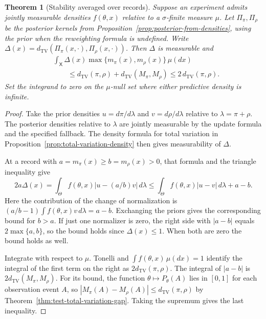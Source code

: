 \documentclass[11pt,oneside]{book}
\newtheorem{theorem}{Theorem}[chapter]
\theoremstyle{definition}
\theoremstyle{remark}
\begin{document}
\begin{theorem}[Stability averaged over records]
\label{thm:bayesian-prior-sensitivity-average}
Suppose an experiment admits jointly measurable densities
$f(\theta,x)$ relative to a $\sigma$-finite measure $\mu$.
Let $\Pi_\pi,\Pi_\rho$ be the posterior kernels from
Proposition~\ref{prop:posterior-from-densities}, using the prior
when the reweighting formula is undefined. Write
$\Delta(x)=d_{\mathrm{TV}}(\Pi_\pi(x,\cdot),\Pi_\rho(x,\cdot))$.
Then $\Delta$ is measurable and
\begin{equation}
\begin{aligned}
&\int_{\mathsf X}\Delta(x)\max\{m_\pi(x),m_\rho(x)\}\,\mu(dx)\\
&\qquad\leq d_{\mathrm{TV}}(\pi,\rho)+d_{\mathrm{TV}}(M_\pi,M_\rho)
\leq 2\,d_{\mathrm{TV}}(\pi,\rho).
\end{aligned}
\label{eq:bayesian-prior-sensitivity-average}
\end{equation}
Set the integrand to zero on the $\mu$-null set where either
predictive density is infinite.
\end{theorem}
\begin{proof}
Take the prior densities $u=d\pi/d\lambda$ and $v=d\rho/d\lambda$
relative to $\lambda=\pi+\rho$. The posterior densities relative
to $\lambda$ are jointly measurable by the update formula and
the specified fallback. The density formula for total variation
in Proposition~\ref{prop:total-variation-density} then gives
measurability of $\Delta$.

At a record with $a=m_\pi(x)\geq b=m_\rho(x)>0$, that formula
and the triangle inequality give
\[
2a\Delta(x)
=\int_\Theta f(\theta,x)|u-(a/b)v|\,d\lambda
\leq\int_\Theta f(\theta,x)|u-v|\,d\lambda +a-b.
\]
Here the contribution of the change of normalization is
$(a/b-1)\int f(\theta,x)v\,d\lambda=a-b$.
Exchanging the priors gives the corresponding bound for $b>a$.
If just one normalizer is zero, the right side with $|a-b|$
equals $2\max\{a,b\}$, so the bound holds since $\Delta(x)\leq1$.
When both are zero the bound holds as well.

Integrate with respect to $\mu$. Tonelli and
$\int f(\theta,x)\,\mu(dx)=1$ identify the integral of the
first term on the right as $2d_{\mathrm{TV}}(\pi,\rho)$.
The integral of $|a-b|$ is $2d_{\mathrm{TV}}(M_\pi,M_\rho)$.
For its bound, the function $\theta\mapsto P_\theta(A)$ lies
in $[0,1]$ for each observation event $A$, so
$|M_\pi(A)-M_\rho(A)|\leq d_{\mathrm{TV}}(\pi,\rho)$ by
Theorem~\ref{thm:test-total-variation-gap}. Taking the
supremum gives the last inequality.
\end{proof}
\end{document}
